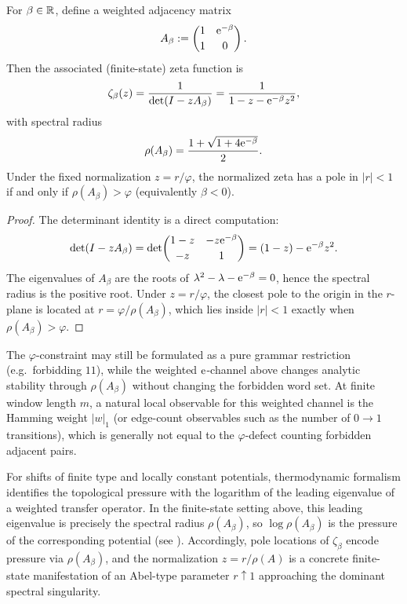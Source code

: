 \begin{proposition}
\label{prop:weighted_golden_mean_zeta}
For $\beta\in\mathbb{R}$, define a weighted adjacency matrix
\[
A_\beta:=\begin{pmatrix}1 & \mathrm{e}^{-\beta}\\[2pt] 1 & 0\end{pmatrix}.
\]
Then the associated (finite-state) zeta function is
\[
\zeta_\beta(z)=\frac{1}{\det(I-zA_\beta)}=\frac{1}{1-z-\mathrm{e}^{-\beta}z^2},
\]
with spectral radius
\[
\rho(A_\beta)=\frac{1+\sqrt{1+4\mathrm{e}^{-\beta}}}{2}.
\]
Under the fixed normalization $z=r/\varphi$, the normalized zeta has a pole in $|r|<1$ if and only if $\rho(A_\beta)>\varphi$ (equivalently $\beta<0$).
\end{proposition}

\begin{proof}
The determinant identity is a direct computation:
\[
\det(I-zA_\beta)=\det\!\begin{pmatrix}1-z & -z\mathrm{e}^{-\beta}\\[2pt] -z & 1\end{pmatrix}
=(1-z)-\mathrm{e}^{-\beta}z^2.
\]
The eigenvalues of $A_\beta$ are the roots of $\lambda^2-\lambda-\mathrm{e}^{-\beta}=0$, hence the spectral radius is the positive root.
Under $z=r/\varphi$, the closest pole to the origin in the $r$-plane is located at $r=\varphi/\rho(A_\beta)$, which lies inside $|r|<1$ exactly when $\rho(A_\beta)>\varphi$.
\end{proof}

\begin{remark}
The $\varphi$-constraint may still be formulated as a pure grammar restriction (e.g.\ forbidding $11$), while the weighted $\mathrm{e}$-channel above changes analytic stability through $\rho(A_\beta)$ without changing the forbidden word set.
At finite window length $m$, a natural local observable for this weighted channel is the Hamming weight $|w|_1$ (or edge-count observables such as the number of $0\to 1$ transitions), which is generally not equal to the $\varphi$-defect counting forbidden adjacent pairs.
\end{remark}

\begin{remark}
For shifts of finite type and locally constant potentials, thermodynamic formalism identifies the topological pressure with the logarithm of the leading eigenvalue of a weighted transfer operator.
In the finite-state setting above, this leading eigenvalue is precisely the spectral radius $\rho(A_\beta)$, so $\log\rho(A_\beta)$ is the pressure of the corresponding potential (see \cite{Ruelle1978,Bowen1975}).
Accordingly, pole locations of $\zeta_\beta$ encode pressure via $\rho(A_\beta)$, and the normalization $z=r/\rho(A)$ is a concrete finite-state manifestation of an Abel-type parameter $r\uparrow 1$ approaching the dominant spectral singularity.
\end{remark}

